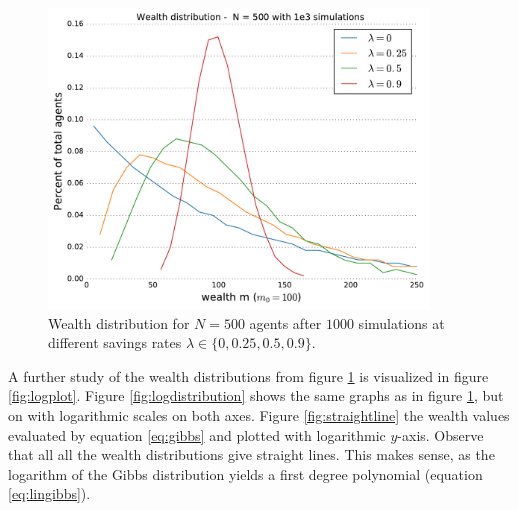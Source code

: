 \documentclass[10pt, a4paper]{amsart}
\begin{document}
\begin{figure}
	\centering
	\includegraphics[width=0.9\textwidth]{../figures/5ac/5c_N500_varSavings.pdf}
	\caption{Wealth distribution for $N=500$ agents after $1000$ simulations at different savings rates $\lambda \in \{0,0.25,0.5,0.9\}$.}
	\label{fig:distribution}
\end{figure}

A further study of the wealth distributions from figure \ref{fig:distribution} is visualized in figure \ref{fig:logplot}. Figure  \ref{fig:logdistribution} shows the same graphs as in figure \ref{fig:distribution}, but on with logarithmic scales on both axes. Figure \ref{fig:straightline} the wealth values evaluated by equation \ref{eq:gibbs} and plotted with logarithmic $y$-axis. Observe that all all the wealth distributions give straight lines. This makes sense, as the logarithm of the Gibbs distribution yields a first degree polynomial (equation \ref{eq:lingibbs}).
\end{document}
